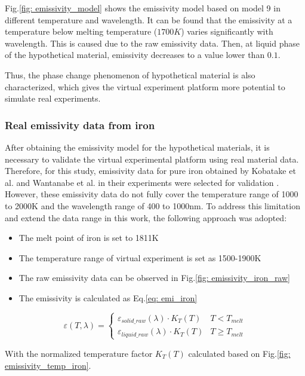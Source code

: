 Fig.\ref{fig: emissivity_model} shows the emissivity model based 
on model 9 in different temperature 
and wavelength. It can be found that the emissivity at a temperature 
below melting temperature ($1700K$) varies significantly with wavelength.
This is caused due to the raw emissivity data. Then, at liquid phase of 
the hypothetical material, emissivity decreases to a value lower than $0.1$.


Thus, the phase change phenomenon of hypothetical material is also characterized, 
which gives the virtual experiment platform more potential to simulate 
real experiments.


\subsubsection{Real emissivity data from iron}
After obtaining the emissivity model for the hypothetical materials, it is 
necessary to validate the virtual experimental platform 
using real material data. Therefore, for this study, emissivity data for pure 
iron obtained by Kobatake et al. and Wantanabe et al. in their experiments were 
selected for validation \cite{Kobatake.2012, Watanabe.2003}. However, these 
emissivity data do not fully cover the temperature range of 1000 to 2000K and 
the wavelength range of 400 to 1000nm. To address this limitation and extend the 
data range in this work, the following approach was adopted:

\begin{itemize}
  \item The melt point of iron is set to 1811K
  \item The temperature range of virtual experiment is set as 1500-1900K
  \item The raw emissivity data can be observed in Fig.\ref{fig: emissivity_iron_raw}
  \item The emissivity is calculated as Eq.\ref{eq: emi_iron}
\end{itemize}


\begin{equation}
  \label{eq: emi_iron}
  \varepsilon(T, \lambda) = \begin{cases}
      \varepsilon_{solid{\_}raw}(\lambda) \cdot K_{T}(T)&   T<T_{melt}\\
      \varepsilon_{liquid{\_}raw}(\lambda) \cdot K_{T}(T)&  T\geq T_{melt}
  \end{cases}
\end{equation}


With the normalized temperature factor $K_{T}(T)$ calculated based 
on Fig.\ref{fig: emissivity_temp_iron}.


